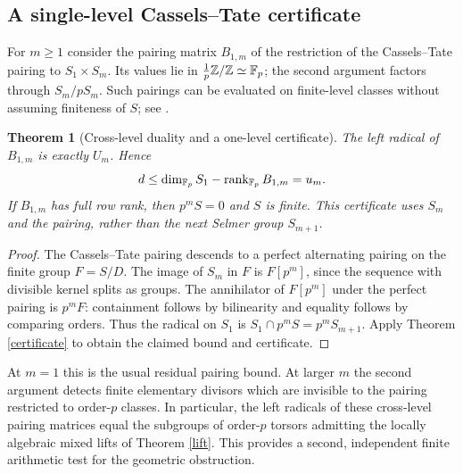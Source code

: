 \documentclass[11pt,a4paper]{article}
\newtheorem{theorem}{Theorem}[section]\newtheorem{lemma}[theorem]{Lemma}\newtheorem{corollary}[theorem]{Corollary}\newtheorem{proposition}[theorem]{Proposition}
\theoremstyle{remark}\newtheorem{remark}[theorem]{Remark}
\begin{document}
\subsection{A single-level Cassels--Tate certificate}
For $m\ge1$ consider the pairing matrix $B_{1,m}$ of the restriction of the Cassels--Tate pairing to $S_1\times S_m$. Its values lie in $\frac1p\mathbb Z/\mathbb Z\simeq\mathbb F_p$; the second argument factors through $S_m/p S_m$. Such pairings can be evaluated on finite-level classes without assuming finiteness of $S$; see \cite{ps,ms}.
\begin{theorem}[Cross-level duality and a one-level certificate]\label{dualcert}
The left radical of $B_{1,m}$ is exactly $U_m$. Hence
\[
 d\le \dim_{\mathbb F_p} S_1-\operatorname{rank}_{\mathbb F_p} B_{1,m}=u_m.
\]
If $B_{1,m}$ has full row rank, then $p^mS=0$ and $S$ is finite. This certificate uses $S_m$ and the pairing, rather than the next Selmer group $S_{m+1}$.
\end{theorem}
\begin{proof}
The Cassels--Tate pairing descends to a perfect alternating pairing on the finite group $F=S/D$. The image of $S_m$ in $F$ is $F[p^m]$, since the sequence with divisible kernel splits as groups. The annihilator of $F[p^m]$ under the perfect pairing is $p^mF$: containment follows by bilinearity and equality follows by comparing orders. Thus the radical on $S_1$ is $S_1\cap p^m S=p^mS_{m+1}$. Apply Theorem \ref{certificate} to obtain the claimed bound and certificate.
\end{proof}
At $m=1$ this is the usual residual pairing bound. At larger $m$ the second argument detects finite elementary divisors which are invisible to the pairing restricted to order-$p$ classes. In particular, the left radicals of these cross-level pairing matrices equal the subgroups of order-$p$ torsors admitting the locally algebraic mixed lifts of Theorem \ref{lift}. This provides a second, independent finite arithmetic test for the geometric obstruction.
\end{document}
